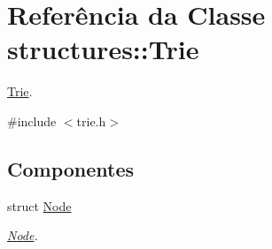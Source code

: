 \hypertarget{classstructures_1_1Trie}{}\section{Referência da Classe structures\+::Trie}
\label{classstructures_1_1Trie}


\mbox{\hyperlink{classstructures_1_1Trie}{Trie}}.  




{\ttfamily \#include $<$trie.\+h$>$}

\subsection*{Componentes}
\begin{DoxyCompactItemize}
\item 
struct \mbox{\hyperlink{structstructures_1_1Trie_1_1Node}{Node}}
\begin{DoxyCompactList}\small\item\em \mbox{\hyperlink{structstructures_1_1Trie_1_1Node}{Node}}. \end{DoxyCompactList}\end{DoxyCompactItemize}
